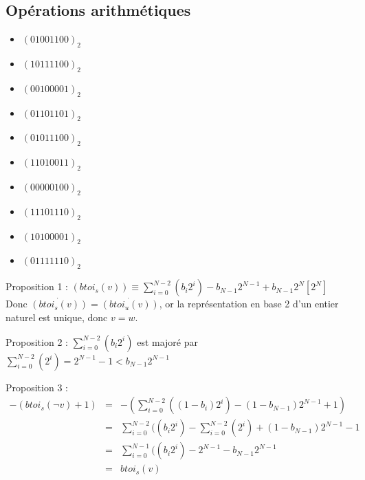 \documentclass[../main.tex]{subfiles}
\begin{document}
\subsection{Opérations arithmétiques}

\begin{minipage}{0.5\textwidth}
\begin{itemize}
	\item $(01001100)_{2}$
	\item $(10111100)_{2}$
	\item $(00100001)_{2}$
	\item $(01101101)_{2}$
	\item $(01011100)_{2}$
\end{itemize}
\end{minipage}
\begin{minipage}{0.5\textwidth}
\begin{itemize}
	\item $(11010011)_{2}$
	\item $(00000100)_{2}$
	\item $(11101110)_{2}$
	\item $(10100001)_{2}$
	\item $(01111110)_{2}$
\end{itemize}
\end{minipage}


Proposition 1 : $(btoi_{s}(v)) \equiv \displaystyle\sum_{i = 0}^{N-2}(b_{i}2^{i}) - b_{N-1}2^{N-1} + b_{N-1}2^{N} [2^{N}]$ \newline
Donc $\dot{(btoi_{s}(v))} = \dot{(btoi_{u}(v))}$, or la représentation en base 2 d'un entier naturel est unique, donc $v = w$.

Proposition 2 : $\displaystyle\sum_{i = 0}^{N-2}(b_{i}2^{i})$ est majoré par $\displaystyle\sum_{i = 0}^{N-2}(2^{i}) = 2^{N-1} - 1 < b_{N-1}2^{N-1}$

Proposition 3 : \[
\begin{array}{lcl}
-(btoi_{s}(\neg{v}) + 1) & = & -(\displaystyle\sum_{i = 0}^{N-2}((1-b_{i})2^{i}) - (1-b_{N-1})2^{N-1} + 1) \\
& = & \displaystyle\sum_{i = 0}^{N-2}((b_{i}2^{i}) - \displaystyle\sum_{i = 0}^{N-2}(2^{i}) + (1 - b_{N-1})2^{N-1} - 1 \\
& = & \displaystyle\sum_{i = 0}^{N-1}((b_{i}2^{i}) - 2^{N-1} - b_{N-1}2^{N-1} \\
& = & btoi_{s}(v)
\end{array}
\]
\end{document}
